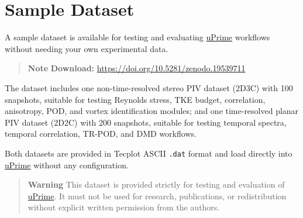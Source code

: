 \section{Sample Dataset}
\label{app:sample}

A sample dataset is available for testing and evaluating \href{https://cmdrryder.github.io/uPrime/}{uPrime} workflows without needing your own experimental data.

\begin{quote}
\textbf{Note}
\textbf{Download:} \url{https://doi.org/10.5281/zenodo.19539711}
\end{quote}

The dataset includes one non-time-resolved stereo PIV dataset (2D3C) with 100 snapshots, suitable for testing Reynolds stress, TKE budget, correlation, anisotropy, POD, and vortex identification modules; and one time-resolved planar PIV dataset (2D2C) with 200 snapshots, suitable for testing temporal spectra, temporal correlation, TR-POD, and DMD workflows.

Both datasets are provided in Tecplot ASCII \texttt{.dat} format and load directly into \href{https://cmdrryder.github.io/uPrime/}{uPrime} without any configuration.

\begin{quote}
\textbf{Warning}
This dataset is provided strictly for testing and evaluation of \href{https://cmdrryder.github.io/uPrime/}{uPrime}. It must not be used for research, publications, or redistribution without explicit written permission from the authors.
\end{quote}

